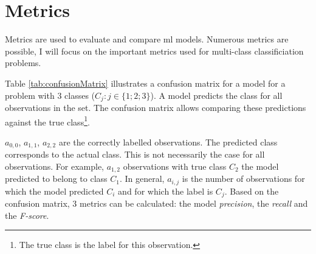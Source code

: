 \section{Metrics}

Metrics are used to evaluate and compare \acrlong{ml} models.
Numerous metrics are possible, I will focus on the important metrics used for multi-class classificiation problems.

Table \ref{tab:confusionMatrix} illustrates a confusion matrix for a model for a problem with 3 classes ($C_j:j\in \{1;2;3\}$). 
A model predicts the class for all observations in the set.
The confusion matrix allows comparing these predictions against the true class\footnote{The true class is the label for this observation.}.

$a_{0,0}$, $a_{1,1}$, $a_{2,2}$ are the correctly labelled observations. 
The predicted class corresponds to the actual class.
This is not necessarily the case for all observations. For example, $a_{1,2}$ observations with true class $C_2$ the model predicted to belong to class $C_1$.
In general, $a_{i,j}$ is the number of observations for which the model predicted $C_i$ and for which the label is $C_j$.
Based on the confusion matrix, 3 metrics can be calculated: the model \textit{precision}, the \textit{recall} and the \textit{F-score}.\newline


